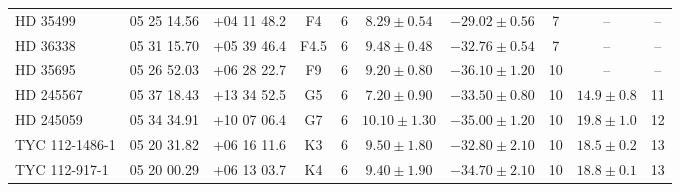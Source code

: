 \documentclass[usenatbib]{mnras}
\begin{document}
\begin{table*}
\begin{tabular}{l c c c c c c c c c}
HD 35499                   &   05 25 14.56               &   +04 11 48.2   &   F4                 &   6   &   $8.29\pm0.54$                                          &   $-29.02\pm0.56$                  &   7        &   --                                            &   --           \\
HD 36338                   &   05 31 15.70               &   +05 39 46.4   &   F4.5              &   6   &   $9.48\pm0.48$                                         &   $-32.76\pm0.54$                   &   7        &   --                                            &   --           \\
HD 35695                   &   05 26 52.03               &   +06 28 22.7   &   F9                 &   6   &   $9.20\pm0.80$                                          &   $-36.10\pm1.20$                   &   10        &           --                                       &   --     \\
HD 245567                  &   05 37 18.43               &   +13 34 52.5   &   G5                &   6   &   $7.20\pm0.90$                                          &   $-33.50\pm0.80$                   &   10        &   $14.9\pm0.8$                      &   11    \\
HD 245059                  &   05 34 34.91               &   +10 07 06.4   &   G7                &   6   &   $10.10\pm1.30$                                        &   $-35.00\pm1.20$                   &   10        &   $19.8\pm1.0$                      &   12      \\
TYC 112-1486-1            &   05 20 31.82               &   +06 16 11.6   &   K3                &   6   &   $9.50\pm1.80$                                            &   $-32.80\pm2.10$                  &   10        &   $18.5\pm0.2$                      &   13      \\
TYC 112-917-1             &   05 20 00.29               &   +06 13 03.7   &   K4                 &   6   &   $9.40\pm1.90$                                            &   $-34.70\pm2.10$                 &   10        &   $18.8\pm0.1$                      &   13      \\

\end{tabular}
\end{table*}
\end{document}

